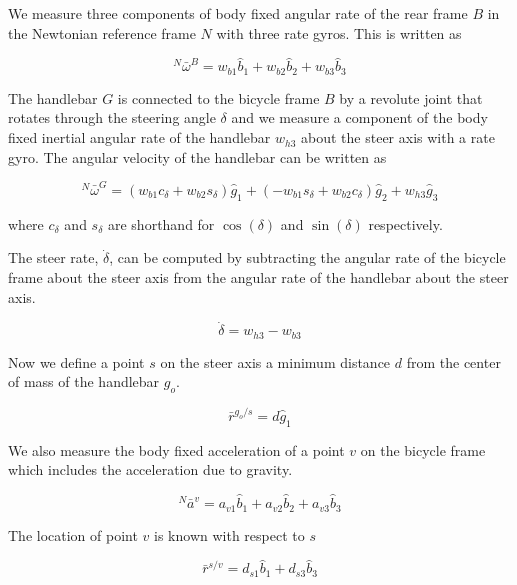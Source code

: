 \documentclass[a4paper]{article}
\begin{document}
We measure three components of body fixed angular rate of the rear frame $B$ in
the Newtonian reference frame $N$ with three rate gyros. This is written as

\begin{equation} ^N\bar{\omega}^B = w_{b1}\hat{b}_1 + w_{b2}\hat{b}_2 +
  w_{b3}\hat{b}_3
  \label{eq:rear-frame-angular-rate}
\end{equation}

The handlebar $G$ is connected to the bicycle frame $B$ by a revolute joint
that rotates through the steering angle $\delta$ and we measure a component of
the body fixed inertial angular rate of the handlebar $w_{h3}$ about the steer
axis with a rate gyro. The angular velocity of the handlebar can be written as

\begin{equation}
  ^N\bar{\omega}^G = (w_{b1}c_\delta + w_{b2}s_\delta)\hat{g}_1 +
  (-w_{b1}s_\delta + w_{b2}c_\delta)\hat{g}_2 +
  w_{h3}\hat{g}_3
\end{equation}

where $c_\delta$ and $s_\delta$ are shorthand for $\operatorname{cos}(\delta)$
and $\operatorname{sin}(\delta)$ respectively.

The steer rate, $\dot{\delta}$, can be computed by subtracting the angular rate
of the bicycle frame about the steer axis from the angular rate of the
handlebar about the steer axis.

\begin{equation}
  \dot{\delta} = w_{h3} - w_{b3}
\end{equation}

Now we define a point $s$ on the steer axis a minimum distance $d$ from the
center of mass of the handlebar $g_o$.

\begin{equation}
  \bar{r}^{g_o/s} = d\hat{g}_1
\end{equation}

We also measure the body fixed acceleration of a point $v$ on the bicycle frame
which includes the acceleration due to gravity.

\begin{equation}
  ^N\bar{a}^v = a_{v1}\hat{b}_1 + a_{v2}\hat{b}_2 + a_{v3}\hat{b}_3
  \label{eq:acceleration-of-v}
\end{equation}

The location of point $v$ is known with respect to $s$

\begin{equation}
  \bar{r}^{s/v} = d_{s1}\hat{b}_1 + d_{s3}\hat{b}_3
\end{equation}
\end{document}
